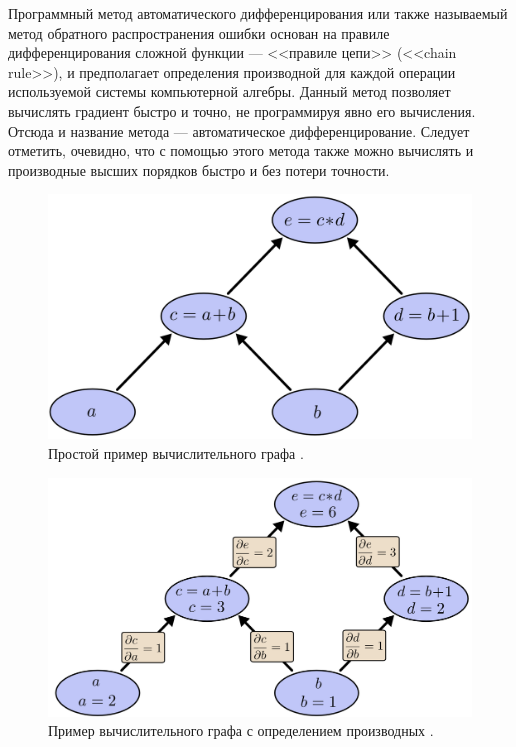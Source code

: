 \documentclass[a4paper,14pt]{extarticle}
\begin{document}
Программный метод автоматического дифференцирования или также называемый метод
обратного распространения ошибки основан на правиле дифференцирования сложной
функции --- <<правиле цепи>> (<<chain rule>>), и предполагает определения
производной для каждой операции используемой системы компьютерной алгебры.
Данный метод позволяет вычислять градиент быстро и точно, не программируя явно
его вычисления. Отсюда и название метода --- автоматическое дифференцирование.
Следует отметить, очевидно, что с помощью этого метода также можно вычислять
и производные высших порядков быстро и без потери точности.

\begin{figure}[H]
\includegraphics[width=\textwidth]{tree-def}
\caption{Простой пример вычислительного графа \cite{colah}.}
\end{figure}

\begin{figure}[H]
\includegraphics[width=\textwidth]{tree-eval-derivs}
\caption{Пример вычислительного графа с определением производных \cite{colah}.}
\end{figure}
\end{document}
